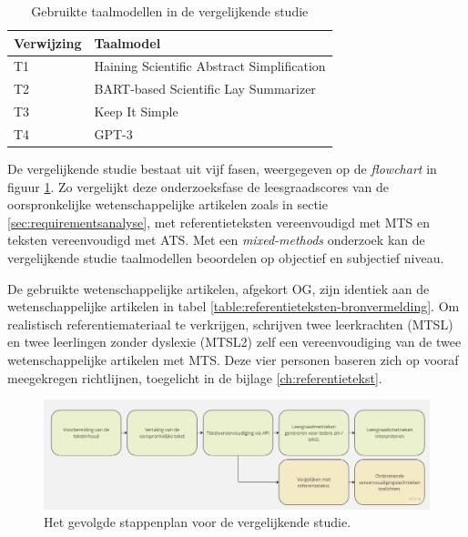 \begin{center}
	\begin{table}[H]
		\begin{tabular}{ | m{4cm} | m{11cm} | } 
			\hline
			\textbf{Verwijzing} & \textbf{Taalmodel} \\
			\hline
			T1 & Haining Scientific Abstract Simplification \\
			\hline
			T2 & BART-based Scientific Lay Summarizer \\
			\hline
			T3 & Keep It Simple\\
			\hline
			T4 & GPT-3 \\
			\hline
		\end{tabular}
		\caption{Gebruikte taalmodellen in de vergelijkende studie}
		\label{table:vergelijkende-studie-taalmodellen}
	\end{table}
\end{center}

De vergelijkende studie bestaat uit vijf fasen, weergegeven op de \textit{flowchart} in figuur \ref{img:flowchart-vergelijkende-studie-metrics}. Zo vergelijkt deze onderzoeksfase de leesgraadscores van de oorspronkelijke wetenschappelijke artikelen zoals in sectie \ref{sec:requirementsanalyse}, met referentieteksten vereenvoudigd met MTS en teksten vereenvoudigd met ATS. Met een \textit{mixed-methods} onderzoek kan de vergelijkende studie taalmodellen beoordelen op objectief en subjectief niveau. 

\medspace

De gebruikte wetenschappelijke artikelen, afgekort OG, zijn identiek aan de wetenschappelijke artikelen in tabel \ref{table:referentieteksten-bronvermelding}. Om realistisch referentiemateriaal te verkrijgen, schrijven twee leerkrachten (MTSL) en twee leerlingen zonder dyslexie (MTSL2) zelf een vereenvoudiging van de twee wetenschappelijke artikelen met MTS. Deze vier personen baseren zich op vooraf meegekregen richtlijnen, toegelicht in de bijlage \ref{ch:referentietekst}. 

\begin{figure}
\includegraphics[width=\linewidth]{img/flowchart-vergelijkende-studie.jpg}
\caption{Het gevolgde stappenplan voor de vergelijkende studie.}
\label{img:flowchart-vergelijkende-studie-metrics}
\end{figure}

